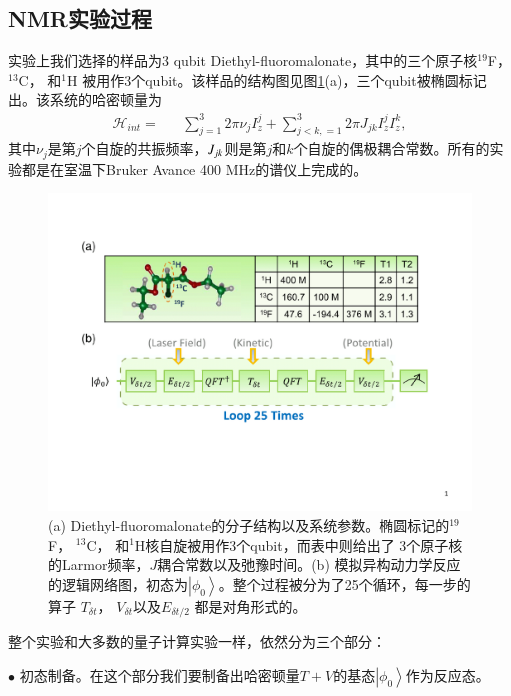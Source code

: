 \subsection{NMR实验过程}

实验上我们选择的样品为3 qubit Diethyl-fluoromalonate，其中的三个原子核$^{19}$F， $^{13}$C， 和$^1$H
被用作3个qubit。该样品的结构图见图\ref{nmrdymnet}(a)，三个qubit被椭圆标记出。该系统的哈密顿量为
\begin{eqnarray}
\mathcal{H}_{int}=&&\sum\limits_{j=1}^3 {2\pi \nu _j } I_z^j  + \sum\limits_{j < k,=1}^3 {2\pi} J_{jk} I_z^j I_z^k,
\end{eqnarray}
其中$\nu_j$是第$j$个自旋的共振频率，$\emph{J}_{jk}$则是第$j$和$k$个自旋的偶极耦合常数。所有的实验都是在室温下Bruker Avance 400 MHz的谱仪上完成的。

 \begin{figure}[htbp]
            \begin{center}
              \includegraphics[width= 0.8\columnwidth]{figures/nmrdymnet.pdf}
              \caption{(a) Diethyl-fluoromalonate的分子结构以及系统参数。椭圆标记的$^{19}$F， $^{13}$C， 和$^1$H核自旋被用作3个qubit，而表中则给出了
              3个原子核的Larmor频率，$J$耦合常数以及弛豫时间。(b) 模拟异构动力学反应的逻辑网络图，初态为$\left\vert \phi_{0} \right\rangle$。整个过程被分为了25个循环，每一步的算子
              $T_{\delta t}$， $V_{\delta t}$以及$E_{\delta t/2}$ 都是对角形式的。}\label{nmrdymnet}
            \end{center}
 \end{figure}

 整个实验和大多数的量子计算实验一样，依然分为三个部分：

 $\bullet$ 初态制备。在这个部分我们要制备出哈密顿量$T+V$的基态$\left\vert \phi_{0} \right\rangle$作为反应态。

